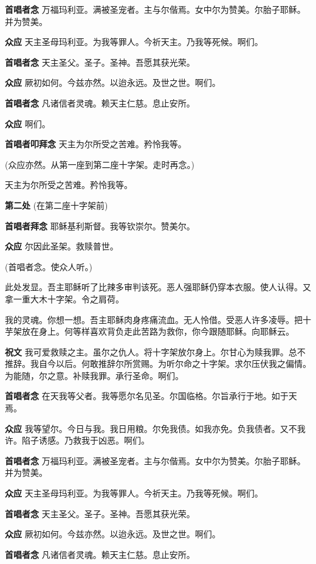 \documentclass[UTF8,17pt]{ctexart}
\begin{document}
\textbf{⾸唱者念} \quad 万福玛利亚。满被圣宠者。主与尔偕焉。⼥中尔为赞美。尔胎⼦耶稣。并为赞美。

\textbf{众应} \quad 天主圣母玛利亚。为我等罪⼈。今祈天主。乃我等死候。啊们。

\textbf{⾸唱者念} \quad 天主圣⽗。圣⼦。圣神。吾愿其获光荣。

\textbf{众应} \quad 厥初如何。今兹亦然。以迨永远。及世之世。啊们。

\textbf{⾸唱者念} \quad 凡诸信者灵魂。赖天主仁慈。息⽌安所。

\textbf{众应} \quad 啊们。


\textbf{⾸唱者叩拜念} \quad 天主为尔所受之苦难。矜怜我等。

(众应亦然。从第一座到第二座⼗字架。⾛时再念。)

天主为尔所受之苦难。矜怜我等。

\textbf{第二处} (在第二座⼗字架前)

\textbf{⾸唱者拜念} \quad 耶稣基利斯督。我等钦崇尔。赞美尔。

\textbf{众应} \quad 尔因此圣架。救赎普世。

(⾸唱者念。使众⼈听。)

此处发显。吾主耶稣听了⽐辣多审判该死。恶⼈强耶稣仍穿本⾐服。使⼈认得。又拿⼀重⼤⽊⼗字架。令之肩荷。

我的灵魂。你想⼀想。吾主耶稣⾁⾝疼痛流⾎。⽆⼈怜借。受恶⼈许多凌辱。把⼗芋架放在⾝上。何等样喜欢背负⾛此苦路为救你，你今跟随耶稣。向耶稣云。

\textbf{祝⽂} \quad 我可爱救赎之主。虽尔之仇⼈。将⼗字架放尔⾝上。尔⽢⼼为赎我罪。总不推辞。我⾃今以后。何敢推辞尔所赏赐。为听尔命之⼗字架。求尔压伏我之偏情。为能随，尔之意。补赎我罪。承⾏圣命。啊们。

\textbf{⾸唱者念} \quad 在天我等⽗者。我等愿尔名见圣。尔国临格。尔旨承⾏于地。如于天焉。

\textbf{众应} \quad 我等望尔。今⽇与我。我⽇⽤粮。尔免我债。如我亦免。负我债者。又不我许。陷⼦诱感。乃救我于凶恶。啊们。

\textbf{⾸唱者念} \quad 万福玛利亚。满被圣宠者。主与尔偕焉。⼥中尔为赞美。尔胎⼦耶稣。并为赞美。

\textbf{众应} \quad 天主圣母玛利亚。为我等罪⼈。今祈天主。乃我等死候。啊们。

\textbf{⾸唱者念} \quad 天主圣⽗。圣⼦。圣神。吾愿其获光荣。

\textbf{众应} \quad 厥初如何。今兹亦然。以迨永远。及世之世。啊们。

\textbf{⾸唱者念} \quad 凡诸信者灵魂。赖天主仁慈。息⽌安所。
\end{document}
